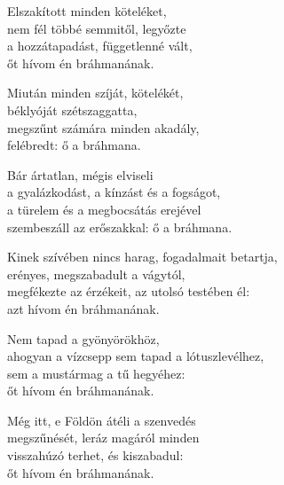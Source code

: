 \begin{dhpverse}

 Elszakított minden köteléket,\\
nem fél többé semmitől, legyőzte\\
a hozzátapadást, függetlenné vált,\\
őt hívom én bráhmanának.

 Miután minden szíját, kötelékét,\\
béklyóját szétszaggatta,\\
megszűnt számára minden akadály,\\
felébredt: ő a bráhmana.

 Bár ártatlan, mégis elviseli\\
a gyalázkodást, a kínzást és a fogságot,\\
a türelem és a megbocsátás erejével\\
szembeszáll az erőszakkal: ő a bráhmana.

 Kinek szívében nincs harag, fogadalmait betartja,\\
erényes, megszabadult a vágytól,\\
megfékezte az érzékeit, az utolsó testében él:\\
azt hívom én bráhmanának.

 Nem tapad a gyönyörökhöz,\\
ahogyan a vízcsepp sem tapad a lótuszlevélhez,\\
sem a mustármag a tű hegyéhez:\\
őt hívom én bráhmanának.

 Még itt, e Földön átéli a szenvedés\\
megszűnését, leráz magáról minden\\
visszahúzó terhet, és kiszabadul:\\
őt hívom én bráhmanának.

\end{dhpverse}
\newpage
